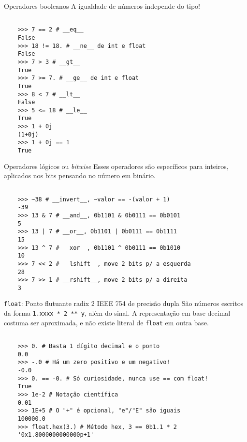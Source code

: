 \documentclass[utf8]{beamer}
\begin{document}
\begin{frame}[fragile]{Operadores booleanos}
  A igualdade de números independe do tipo!

  \begin{verbatim}

    >>> 7 == 2 # __eq__
    False
    >>> 18 != 18. # __ne__ de int e float
    False
    >>> 7 > 3 # __gt__
    True
    >>> 7 >= 7. # __ge__ de int e float
    True
    >>> 8 < 7 # __lt__
    False
    >>> 5 <= 18 # __le__
    True
    >>> 1 + 0j
    (1+0j)
    >>> 1 + 0j == 1
    True

  \end{verbatim}

\end{frame}


\begin{frame}[fragile]{Operadores lógicos ou \emph{bitwise}}
  Esses operadores são específicos para inteiros,
  aplicados nos bits pensando no número em binário.

  \begin{verbatim}

    >>> ~38 # __invert__, ~valor == -(valor + 1)
    -39
    >>> 13 & 7 # __and__, 0b1101 & 0b0111 == 0b0101
    5
    >>> 13 | 7 # __or__, 0b1101 | 0b0111 == 0b1111
    15
    >>> 13 ^ 7 # __xor__, 0b1101 ^ 0b0111 == 0b1010
    10
    >>> 7 << 2 # __lshift__, move 2 bits p/ a esquerda
    28
    >>> 7 >> 1 # __rshift__, move 2 bits p/ a direita
    3

  \end{verbatim}

\end{frame}


\begin{frame}[fragile]{\texttt{float}:
                       Ponto flutuante radix $2$
                       IEEE 754 de precisão dupla}
  São números escritos da forma \texttt{1.xxxx * 2 ** y},
  além do sinal.
  A representação em base decimal costuma ser aproximada,
  e não existe literal de \texttt{float} em outra base.

  \begin{verbatim}

    >>> 0. # Basta 1 dígito decimal e o ponto
    0.0
    >>> -.0 # Há um zero positivo e um negativo!
    -0.0
    >>> 0. == -0. # Só curiosidade, nunca use == com float!
    True
    >>> 1e-2 # Notação científica
    0.01
    >>> 1E+5 # O "+" é opcional, "e"/"E" são iguais
    100000.0
    >>> float.hex(3.) # Método hex, 3 == 0b1.1 * 2
    '0x1.8000000000000p+1'

  \end{verbatim}

\end{frame}
\end{document}

